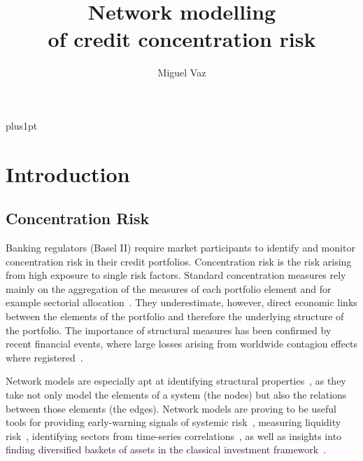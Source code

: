 \documentclass[12pt,beltcrest]{ociamthesis} %
\title{Network modelling \\[1ex]
of credit concentration risk}
\author{Miguel Vaz}        %
\begin{document}
\baselineskip=18pt plus1pt

\setcounter{secnumdepth}{3}
\setcounter{tocdepth}{3}


\maketitle                  %

\begin{romanpages}          %
\tableofcontents            %
\listoffigures              %
\end{romanpages}            %

\chapter{Introduction}
\section{Concentration Risk} %
\label{sec:concentration_risk}



Banking regulators (Basel II) require market participants to identify and monitor concentration risk in their credit portfolios. Concentration risk is the risk arising from high exposure to single risk factors. Standard concentration measures rely mainly on the aggregation of the measures of each portfolio element and for example sectorial allocation~\citep{lutkebohmert2008concentration}. They underestimate, however, direct economic links between the elements of the portfolio and therefore the underlying structure of the portfolio. The importance of structural measures has been confirmed by recent financial events, where large losses arising from worldwide contagion effects where registered~\citep{Kazi:2013vr}.
	
Network models are especially apt at identifying structural properties~\citep{newman2010networks}, as they take not only model the elements of a system (the nodes) but also the relations between those elements (the edges). Network models are proving to be useful tools for providing early-warning signals of systemic risk~\citep{Squartini:2013ev}, measuring liquidity risk~\citep{Karas:2012tp}, identifying sectors from time-series correlations~\citep{Onnela:2004vz,Fenn:2009uf,Fenn:2011kp}, as well as insights into finding diversified baskets of assets in the classical investment framework~\citep{Pozzi:2013ci}.
\end{document}
